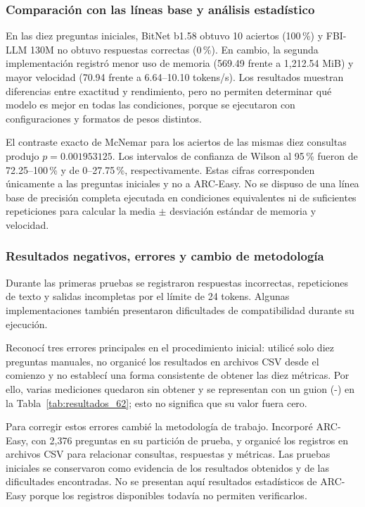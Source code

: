 \filbreak
\subsubsection{Comparación con las líneas base y análisis estadístico}

En las diez preguntas iniciales, BitNet b1.58 obtuvo 10 aciertos (100\,\%) y FBI-LLM 130M no obtuvo respuestas correctas (0\,\%). En cambio, la segunda implementación registró menor uso de memoria (569.49 frente a 1,212.54 MiB) y mayor velocidad (70.94 frente a 6.64--10.10 tokens/s). Los resultados muestran diferencias entre exactitud y rendimiento, pero no permiten determinar qué modelo es mejor en todas las condiciones, porque se ejecutaron con configuraciones y formatos de pesos distintos.

El contraste exacto de McNemar para los aciertos de las mismas diez consultas produjo $p=0.001953125$. Los intervalos de confianza de Wilson al 95\,\% fueron de 72.25--100\,\% y de 0--27.75\,\%, respectivamente. Estas cifras corresponden únicamente a las preguntas iniciales y no a ARC-Easy. No se dispuso de una línea base de precisión completa ejecutada en condiciones equivalentes ni de suficientes repeticiones para calcular la media $\pm$ desviación estándar de memoria y velocidad.

\subsubsection{Resultados negativos, errores y cambio de metodología}

Durante las primeras pruebas se registraron respuestas incorrectas, repeticiones de texto y salidas incompletas por el límite de 24 tokens. Algunas implementaciones también presentaron dificultades de compatibilidad durante su ejecución.

Reconocí tres errores principales en el procedimiento inicial: utilicé solo diez preguntas manuales, no organicé los resultados en archivos CSV desde el comienzo y no establecí una forma consistente de obtener las diez métricas. Por ello, varias mediciones quedaron sin obtener y se representan con un guion (-) en la Tabla~\ref{tab:resultados_62}; esto no significa que su valor fuera cero.

Para corregir estos errores cambié la metodología de trabajo. Incorporé ARC-Easy, con 2,376 preguntas en su partición de prueba, y organicé los registros en archivos CSV para relacionar consultas, respuestas y métricas. Las pruebas iniciales se conservaron como evidencia de los resultados obtenidos y de las dificultades encontradas. No se presentan aquí resultados estadísticos de ARC-Easy porque los registros disponibles todavía no permiten verificarlos.


